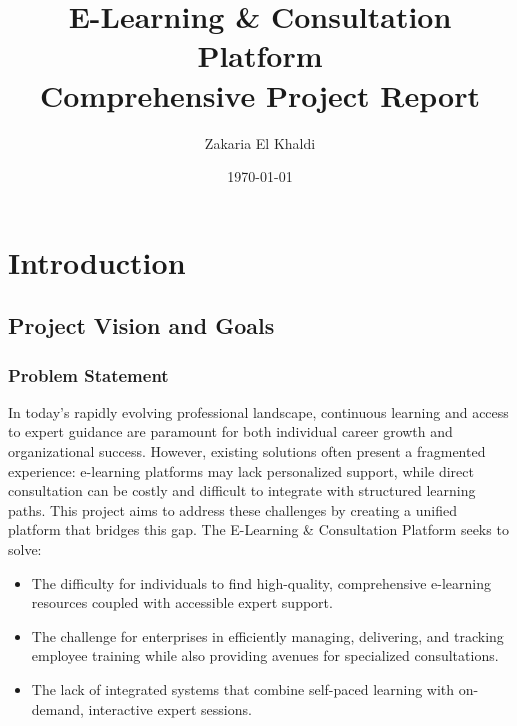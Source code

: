\documentclass[12pt, a4paper]{report} %
\title{
  \Huge\textbf{E-Learning \& Consultation Platform} \\
  \vspace{0.5em}
  \Large Comprehensive Project Report
}
\author{Zakaria El Khaldi}
\date{\today}
\begin{document}

\maketitle
\thispagestyle{empty} %
\newpage

\tableofcontents
\newpage
{} %
\setcounter{page}{1}

\chapter{Introduction}
\section{Project Vision and Goals}
  \subsection{Problem Statement}
    In today's rapidly evolving professional landscape, continuous learning and access to expert guidance are paramount for both individual career growth and organizational success. However, existing solutions often present a fragmented experience: e-learning platforms may lack personalized support, while direct consultation can be costly and difficult to integrate with structured learning paths. This project aims to address these challenges by creating a unified platform that bridges this gap.
    The E-Learning \& Consultation Platform seeks to solve:
    \begin{itemize}
        \item The difficulty for individuals to find high-quality, comprehensive e-learning resources coupled with accessible expert support.
        \item The challenge for enterprises in efficiently managing, delivering, and tracking employee training while also providing avenues for specialized consultations.
        \item The lack of integrated systems that combine self-paced learning with on-demand, interactive expert sessions.
    \end{itemize}
\end{document}
